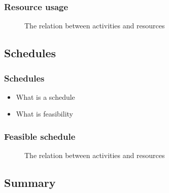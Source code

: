 \documentclass{beamer}
\theoremstyle{definition}
\newcommand{\inputtikz}[1]{}
\begin{document}
\begin{frame}
	\frametitle{Resource usage}
	\vspace{-.2em}
	\begin{figure}[ht]
		\makebox[\textwidth][c]{\resizebox{.7\paperwidth}{!}{
			\inputtikz{usage}
		}}
		\vspace{-1em}
		\caption{The relation between activities and resources}
		\label{fig:activity_graph}
	\end{figure}
\end{frame}

\subsection{Schedules}
\begin{frame}
	\frametitle{Schedules}
	\begin{itemize}
		\item What is a schedule
		\item What is feasibility
	\end{itemize}
\end{frame}

\begin{frame}
	\frametitle{Feasible schedule}
	\vspace{-1em}
	\begin{figure}[ht]
		\makebox[\textwidth][c]{\resizebox{.38\paperwidth}{!}{
			\inputtikz{schedule_feasible_profile}
		}}
		\vspace{-1.2em}
		\caption{The relation between activities and resources}
		\label{fig:activity_graph}
	\end{figure}
\end{frame}

\subsection{Summary}
\end{document}
